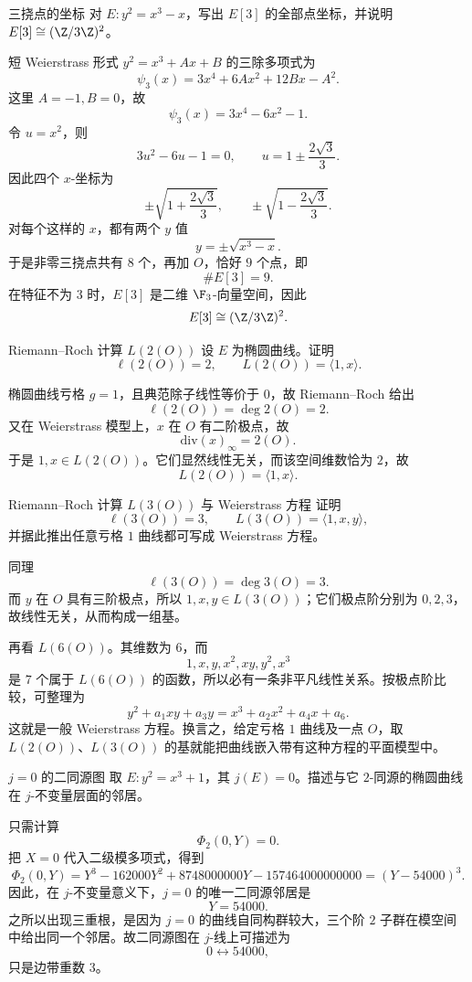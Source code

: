 \begin{problem}{三挠点的坐标 \medium}
对 $E:y^2=x^3-x$，写出 $E[3]$ 的全部点坐标，并说明 $E[3]\cong (\Z/3\Z)^2$。
\end{problem}
\begin{solution}
短 Weierstrass 形式 $y^2=x^3+Ax+B$ 的三除多项式为
\[
\psi_3(x)=3x^4+6Ax^2+12Bx-A^2.
\]
这里 $A=-1,B=0$，故
\[
\psi_3(x)=3x^4-6x^2-1.
\]
令 $u=x^2$，则
\[
3u^2-6u-1=0,
\qquad
u=1\pm\frac{2\sqrt3}{3}.
\]
因此四个 $x$-坐标为
\[
\pm\sqrt{1+\frac{2\sqrt3}{3}},
\qquad
\pm\sqrt{1-\frac{2\sqrt3}{3}}.
\]
对每个这样的 $x$，都有两个 $y$ 值
\[
y=\pm\sqrt{x^3-x}.
\]
于是非零三挠点共有 $8$ 个，再加 $O$，恰好 $9$ 个点，即
\[
\#E[3]=9.
\]
在特征不为 $3$ 时，$E[3]$ 是二维 $\F_3$-向量空间，因此
\[
E[3]\cong (\Z/3\Z)^2.
\]
\end{solution}

\begin{problem}{Riemann--Roch 计算 $L(2(O))$ \medium}
设 $E$ 为椭圆曲线。证明
\[
\ell(2(O))=2,
\qquad
L(2(O))=\langle 1,x\rangle.
\]
\end{problem}
\begin{solution}
椭圆曲线亏格 $g=1$，且典范除子线性等价于 $0$，故 Riemann--Roch 给出
\[
\ell(2(O))=\deg 2(O)=2.
\]
又在 Weierstrass 模型上，$x$ 在 $O$ 有二阶极点，故
\[
\mathrm{div}(x)_\infty=2(O).
\]
于是 $1,x\in L(2(O))$。它们显然线性无关，而该空间维数恰为 $2$，故
\[
L(2(O))=\langle 1,x\rangle.
\]
\end{solution}

\begin{problem}{Riemann--Roch 计算 $L(3(O))$ 与 Weierstrass 方程 \medium}
证明
\[
\ell(3(O))=3,
\qquad
L(3(O))=\langle 1,x,y\rangle,
\]
并据此推出任意亏格 $1$ 曲线都可写成 Weierstrass 方程。
\end{problem}
\begin{solution}
同理
\[
\ell(3(O))=\deg 3(O)=3.
\]
而 $y$ 在 $O$ 具有三阶极点，所以 $1,x,y\in L(3(O))$；它们极点阶分别为 $0,2,3$，故线性无关，从而构成一组基。

再看 $L(6(O))$。其维数为 $6$，而
\[
1,x,y,x^2,xy,y^2,x^3
\]
是 $7$ 个属于 $L(6(O))$ 的函数，所以必有一条非平凡线性关系。按极点阶比较，可整理为
\[
y^2+a_1xy+a_3y=x^3+a_2x^2+a_4x+a_6.
\]
这就是一般 Weierstrass 方程。换言之，给定亏格 $1$ 曲线及一点 $O$，取
$L(2(O))$、$L(3(O))$ 的基就能把曲线嵌入带有这种方程的平面模型中。
\end{solution}

\begin{problem}{$j=0$ 的二同源图 \medium}
取 $E:y^2=x^3+1$，其 $j(E)=0$。描述与它 $2$-同源的椭圆曲线在 $j$-不变量层面的邻居。
\end{problem}
\begin{solution}
只需计算
\[
\Phi_2(0,Y)=0.
\]
把 $X=0$ 代入二级模多项式，得到
\[
\Phi_2(0,Y)=Y^3-162000Y^2+8748000000Y-157464000000000=(Y-54000)^3.
\]
因此，在 $j$-不变量意义下，$j=0$ 的唯一二同源邻居是
\[
Y=54000.
\]
之所以出现三重根，是因为 $j=0$ 的曲线自同构群较大，三个阶 $2$ 子群在模空间中给出同一个邻居。故二同源图在 $j$-线上可描述为
\[
0\longleftrightarrow 54000,
\]
只是边带重数 $3$。
\end{solution}

